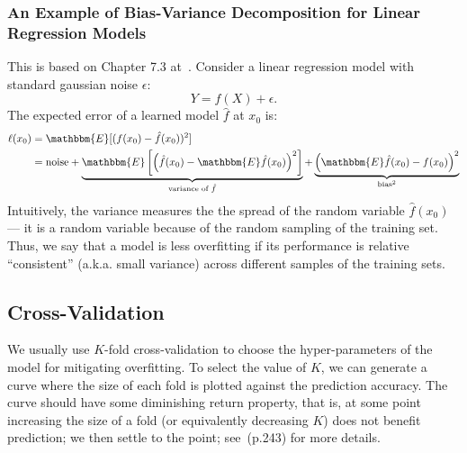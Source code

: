         \subsubsection{An Example of Bias-Variance Decomposition for Linear Regression Models }
        This is based on Chapter 7.3 at~\cite{hastie2009elements}.
        Consider a linear regression model with standard gaussian noise $\epsilon$:
            \begin{equation}
                Y = f(X) + \epsilon.
            \end{equation}
        The expected error of a learned model $\hat{f}$ at $x_0$ is:
            \begin{equation}
                \begin{aligned}
                    \ell(x_0) & = \mathbbm{E}[(f(x_0) - \hat{f}(x_0))^2] \\
                    & = \text{noise} + \underbrace{\mathbbm{E}\left[\left(\hat{f}(x_0) - \mathbbm{E}\hat{f}(x_0) \right)^2 \right]}_{\text{variance of $\hat{f}$}} + \underbrace{\left( \mathbbm{E}\hat{f}(x_0) - f(x_0) \right)^2}_{\text{bias}^2}
                \end{aligned}
            \end{equation}
        Intuitively, the variance measures the the spread of the random variable $\hat{f}(x_0)$ --- it is a random variable because of the random sampling of the training set.
        Thus, we say that a model is less overfitting if its performance is relative ``consistent'' (a.k.a. small variance) across different samples of the training sets. 
        
        


\subsection{Cross-Validation}
    We usually use $K$-fold cross-validation to choose the hyper-parameters of the model for mitigating overfitting.
    To select the value of $K$, we can generate a curve where the size of each fold is plotted against the prediction accuracy. 
    The curve should have some diminishing return property, that is, at some point increasing the size of a fold (or equivalently decreasing $K$) does not benefit prediction; we then settle to the point; see~\cite{hastie2009elements}(p.243) for more details.



